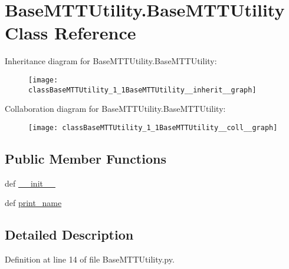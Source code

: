 \hypertarget{classBaseMTTUtility_1_1BaseMTTUtility}{\section{Base\-M\-T\-T\-Utility.\-Base\-M\-T\-T\-Utility Class Reference}
\label{classBaseMTTUtility_1_1BaseMTTUtility}
}


Inheritance diagram for Base\-M\-T\-T\-Utility.\-Base\-M\-T\-T\-Utility\-:\nopagebreak
\begin{figure}[H]
\begin{center}
\leavevmode
\texttt{[image: classBaseMTTUtility\_1\_1BaseMTTUtility\_\_inherit\_\_graph]}
\end{center}
\end{figure}


Collaboration diagram for Base\-M\-T\-T\-Utility.\-Base\-M\-T\-T\-Utility\-:\nopagebreak
\begin{figure}[H]
\begin{center}
\leavevmode
\texttt{[image: classBaseMTTUtility\_1\_1BaseMTTUtility\_\_coll\_\_graph]}
\end{center}
\end{figure}
\subsection*{Public Member Functions}
\begin{DoxyCompactItemize}
\item 
def \hyperlink{classBaseMTTUtility_1_1BaseMTTUtility_acc17cee13f814473c5cea32a8e2eebeb}{\-\_\-\-\_\-init\-\_\-\-\_\-}
\item 
def \hyperlink{classBaseMTTUtility_1_1BaseMTTUtility_a65cd8c577d1fea0bf1edc05969fbe31e}{print\-\_\-name}
\end{DoxyCompactItemize}


\subsection{Detailed Description}


Definition at line 14 of file Base\-M\-T\-T\-Utility.\-py.



